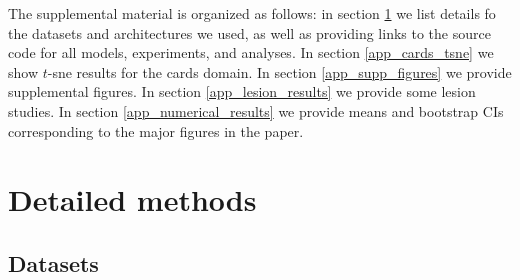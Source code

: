 \appendix
The supplemental material is organized as follows: in section \ref{app_detailed_methods} we list details fo the datasets and architectures we used, as well as providing links to the source code for all models, experiments, and analyses. In section \ref{app_cards_tsne} we show $t$-sne results for the cards domain. In section \ref{app_supp_figures} we provide supplemental figures. In section \ref{app_lesion_results} we provide some lesion studies. In section \ref{app_numerical_results} we provide means and bootstrap CIs corresponding to the major figures in the paper. 
\section{Detailed methods} \label{app_detailed_methods}
\subsection{Datasets}
